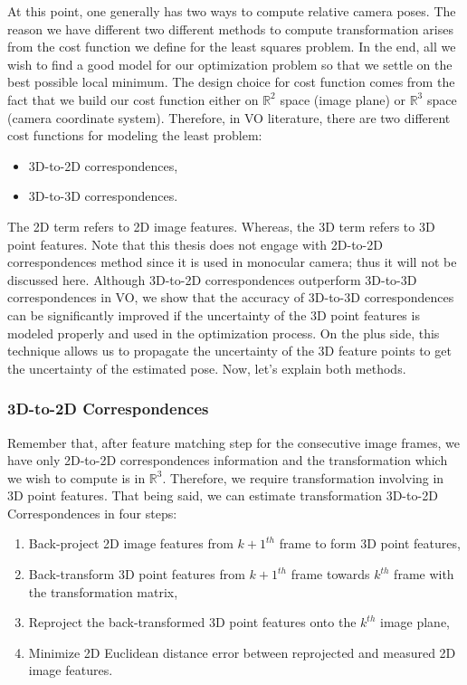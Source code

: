 \documentclass[a4paper]{report}
\numberwithin{figure}{section}
\newcommand{\R}{\mathbb{R}}
\begin{document}
At this point, one generally has two ways to compute relative camera poses.  
The reason we have different two different methods to compute transformation 
arises 
from the cost function we define for the least squares problem. In the end, 
all we wish to find a good model for our optimization problem so that we 
settle on the best possible local minimum.  The design choice for cost 
function comes from the fact that we build our cost function either on $\R^2$ 
space (image plane) or $\R^3$ space (camera coordinate system).  Therefore, in 
VO literature, there are two different cost functions for modeling the least 
problem:

\begin{itemize}
  \item 3D-to-2D correspondences,
  \item 3D-to-3D correspondences.
\end{itemize}


The 2D term refers to 2D image features. Whereas, the 3D term refers to 3D 
point features.  Note that this thesis does not engage with 2D-to-2D 
correspondences method since it is used in monocular camera; thus it will not 
be discussed here. Although 3D-to-2D 
correspondences outperform 3D-to-3D correspondences in VO, we show that the 
accuracy of 3D-to-3D correspondences can be significantly improved if the 
uncertainty of the 3D point features is modeled properly and used in the 
optimization process.  On the plus side, this technique allows us to propagate 
the uncertainty of the 3D feature points to get the uncertainty of the 
estimated 
pose. Now, let's explain both methods.


\subsubsection{3D-to-2D Correspondences}\label{sb_sc_3d_to_2d}

Remember that, after feature matching step for the consecutive image frames, 
we have only 2D-to-2D correspondences information and the transformation which 
we wish to compute is in $\R^3$. Therefore, we require transformation 
involving in 3D point features. That being said, we can estimate 
transformation 3D-to-2D Correspondences in four steps:

\begin{enumerate}
  \item Back-project 2D image features from $k+1^{th}$ frame to form 3D point features,
  \item Back-transform 3D point features from $k+1^{th}$ frame towards $k^{th}$ frame 
    with the transformation matrix,
  \item Reproject the back-transformed 3D point features onto the $k^{th}$ image plane, 
  \item Minimize 2D Euclidean distance error between reprojected and measured 2D image features.
\end{enumerate}
\end{document}
